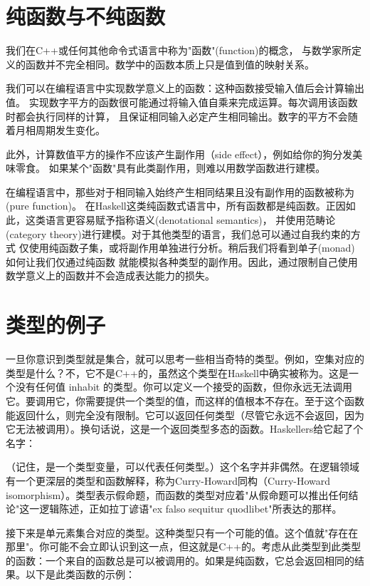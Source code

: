 \section{纯函数与不纯函数}

我们在C++或任何其他命令式语言中称为"函数"(function)的概念，
与数学家所定义的函数并不完全相同。数学中的函数本质上只是值到值的映射关系。

我们可以在编程语言中实现数学意义上的函数：这种函数接受输入值后会计算输出值。
实现数字平方的函数很可能通过将输入值自乘来完成运算。每次调用该函数时都会执行同样的计算，
且保证相同输入必定产生相同输出。数字的平方不会随着月相周期发生变化。

此外，计算数值平方的操作不应该产生副作用（side effect），例如给你的狗分发美味零食。
如果某个"函数"具有此类副作用，则难以用数学函数进行建模。

在编程语言中，那些对于相同输入始终产生相同结果且没有副作用的函数被称为(pure function)。
在Haskell这类纯函数式语言中，所有函数都是纯函数。正因如此，这类语言更容易赋予指称语义(denotational semantics)，
并使用范畴论(category theory)进行建模。对于其他类型的语言，我们总可以通过自我约束的方式
仅使用纯函数子集，或将副作用单独进行分析。稍后我们将看到单子(monad)如何让我们仅通过纯函数
就能模拟各种类型的副作用。因此，通过限制自己使用数学意义上的函数并不会造成表达能力的损失。

\section{类型的例子}

一旦你意识到类型就是集合，就可以思考一些相当奇特的类型。例如，空集对应的类型是什么？不，它不是C++的，虽然这个类型在Haskell中确实被称为。这是一个没有任何值 inhabit 的类型。你可以定义一个接受的函数，但你永远无法调用它。要调用它，你需要提供一个类型的值，而这样的值根本不存在。至于这个函数能返回什么，则完全没有限制。它可以返回任何类型（尽管它永远不会返回，因为它无法被调用）。换句话说，这是一个返回类型多态的函数。Haskellers给它起了个名字：

（记住，是一个类型变量，可以代表任何类型。）这个名字并非偶然。在逻辑领域有一个更深层的类型和函数解释，称为Curry-Howard同构（Curry-Howard isomorphism）。类型表示假命题，而函数的类型对应着"从假命题可以推出任何结论"这一逻辑陈述，正如拉丁谚语"ex falso sequitur quodlibet"所表达的那样。

接下来是单元素集合对应的类型。这种类型只有一个可能的值。这个值就"存在在那里"。你可能不会立即认识到这一点，但这就是C++的。考虑从此类型到此类型的函数：一个来自的函数总是可以被调用的。如果是纯函数，它总会返回相同的结果。以下是此类函数的示例：

